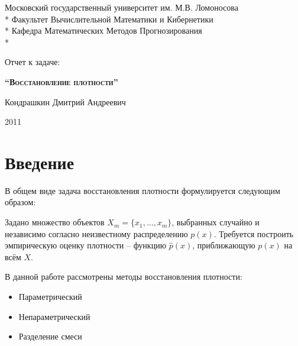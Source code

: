 \documentclass[10pt, a4paper]{article}
\begin{document}
\begin{titlepage}
\newpage

\begin{center}
\vspace{1cm}
Московский государственный университет им. М.В. Ломоносова \\*
Факультет Вычислительной Математики и Кибернетики \\*
Кафедра Математических Методов Прогнозирования \\*
\end{center}


\vspace{8em}

\begin{center}
\Large Отчет к задаче:
\end{center}

\vspace{1.5em}

\begin{center}
\textsc{\textbf{``Восстановление плотности''}}
\end{center}

\vspace{6em}

\begin{flushright}
Кондрашкин Дмитрий Андреевич \\
\vspace{1.5em}
\end{flushright}

\vspace{\fill}

\begin{center}
2011
\end{center}

\end{titlepage}

\newpage
 
\section{Введение}
В общем виде задача восстановления плотности формулируется следующим образом\cite{voron}:

Задано множество объектов $X_m = \{x_1,\hdots,x_m\}$, выбранных случайно и независимо 
согласно неизвестному распределению $p(x)$. Требуется построить
эмпирическую оценку плотности -- функцию $\hat p(x)$, приближающую $p(x)$ на всём $X$.

В данной работе рассмотрены методы восстановления плотности:
\begin{itemize}
\item Параметрический
\item Непараметрический
\item Разделение смеси
\end{itemize}
\end{document}
